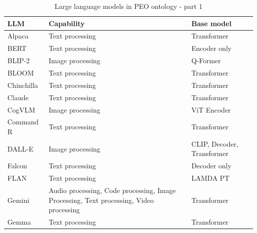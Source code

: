 \begin{table}[H]
    \centering
    \begin{tabular}{|>{\raggedright\arraybackslash}p{4cm}|>{\raggedright\arraybackslash}p{4cm}|>{\raggedright\arraybackslash}p{4cm}|}
        \hline
        \textbf{LLM} & \textbf{Capability} & \textbf{Base model} \\ \hline
        Alpaca & Text processing & Transformer\\ \hline
        BERT & Text processing & Encoder only \\ \hline
        BLIP-2 & Image processing & Q-Former \\ \hline
        BLOOM & Text processing & Transformer \\ \hline
        Chinchilla & Text processing & Transformer \\ \hline
        Claude & Text processing & Transformer \\ \hline
        CogVLM & Image processing & ViT Encoder \\ \hline
        Command R & Text processing & Transformer \\ \hline
        DALL-E & Image processing & CLIP, Decoder, Transformer \\ \hline
        Falcon & Text processing & Decoder only \\ \hline
        FLAN & Text processing & LAMDA PT \\ \hline
        Gemini & Audio processing, Code processing, Image Processing, Text processing, Video processing & Transformer\\ \hline
        Gemma & Text processing & Transformer \\ \hline
    \end{tabular}
    \caption{Large language models in PEO ontology - part 1}
\end{table}


